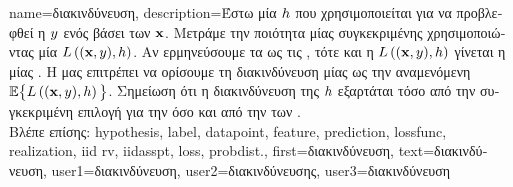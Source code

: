 {name={\foreignlanguage{greek}{διακινδύνευση}},
	description={\foreignlanguage{greek}{Έστω μία}  $h$ 
		\foreignlanguage{greek}{που χρησιμοποιείται για να προβλεφθεί η}  
		$y$ \foreignlanguage{greek}{ενός}  \foreignlanguage{greek}{βάσει των}  ${\bf x}$. 
		\foreignlanguage{greek}{Μετράμε την ποιότητα μίας συγκεκριμένης}  
		 \foreignlanguage{greek}{χρησιμοποιώντας μία}  $L\left(({\bf x},y),h \right)$. 
		\foreignlanguage{greek}{Αν ερμηνεύσουμε τα}  \foreignlanguage{greek}{ως τις}  
		 , \foreignlanguage{greek}{τότε και η 
		$L\left(({\bf x},y),h \right)$ γίνεται η}  
		\foreignlanguage{greek}{μίας} . \foreignlanguage{greek}{Η}  \foreignlanguage{greek}{μας επιτρέπει 
		να ορίσουμε τη διακινδύνευση μίας}  
		\foreignlanguage{greek}{ως την αναμενόμενη}  $\mathbb{E} \big\{L\left(({\bf x},y),h \right) \big\}$. 
		\foreignlanguage{greek}{Σημείωση ότι η διακινδύνευση της $h$ εξαρτάται τόσο από την συγκεκριμένη επιλογή 
		για την}  \foreignlanguage{greek}{όσο και από την}  
		\foreignlanguage{greek}{των} .\\
		\foreignlanguage{greek}{Βλέπε επίσης:} \gls{hypothesis}, \gls{label}, \gls{datapoint}, \gls{feature}, \gls{prediction}, \gls{lossfunc}, \gls{realization}, \gls{iid} \gls{rv}, \gls{iidasspt}, \gls{loss}, \gls{probdist}.},
	first={\foreignlanguage{greek}{διακινδύνευση}},
	text={\foreignlanguage{greek}{διακινδύνευση}},
	user1={\foreignlanguage{greek}{διακινδύνευση}}, %
    	user2={\foreignlanguage{greek}{διακινδύνευσης}}, %
	user3={\foreignlanguage{greek}{διακινδύνευση}} %
}

